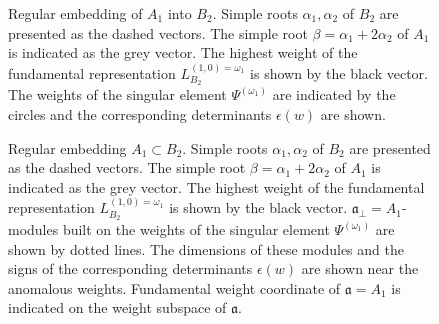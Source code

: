\documentclass[12pt]{iopart}
\theoremstyle{definition}
\newcommand{\af}{\mathfrak{a}}
\newcommand{\afb}{\mathfrak{a}_{\bot}}
\begin{document}
\begin{figure}[p]
  \noindent{}
  \caption{Regular embedding of $A_1$ into $B_2$. Simple roots $\alpha_1, \alpha_2$ of $B_2$ are presented as the dashed vectors.
    The simple root $\beta = \alpha_1+2\alpha_2$ of $A_1$ is indicated as the grey vector.
    The highest weight of the fundamental representation $L^{(1,0)=\omega_1}_{B_2}$ is shown by the black vector.
    The weights of the singular element $\Psi^{(\omega_1)}$ are indicated by the circles and the corresponding determinants $\epsilon(w)$ are shown.}
  \label{fig:B2_A1}

  \noindent{}
  \caption{Regular embedding $A_1\subset B_2$. Simple roots $\alpha_1, \alpha_2$ of $B_2$ are presented as the dashed vectors.
    The simple root $\beta = \alpha_1+2\alpha_2$ of $A_1$ is indicated as the grey vector.
    The highest weight of the fundamental representation $L^{(1,0)=\omega_1}_{B_2}$ is shown by the black vector.  $\afb=A_1$-modules built on the weights of the singular element $\Psi^{(\omega_1)}$ are shown by dotted lines. The dimensions of these modules and the signs of the corresponding determinants $\epsilon(w)$ are shown near the anomalous weights. Fundamental weight coordinate of $\af=A_1$ is indicated on the weight subspace of $\af$. }
  \label{fig:B2_A1_2}
\end{figure}
\end{document}
